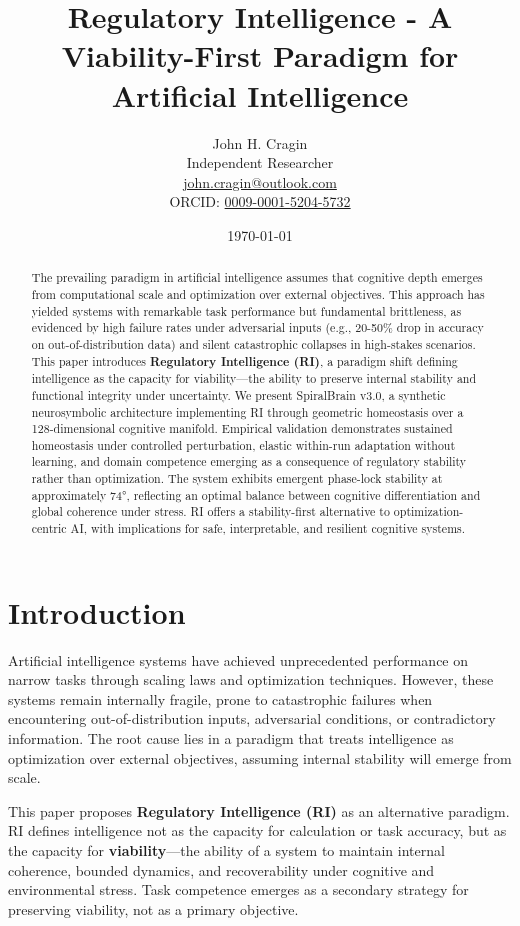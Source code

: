 \documentclass[12pt,a4paper]{report}
\title{Regulatory Intelligence - A Viability-First Paradigm for Artificial Intelligence}
\author{John H. Cragin \\
Independent Researcher \\
\href{mailto:john.cragin@outlook.com}{john.cragin@outlook.com} \\
ORCID: \href{https://orcid.org/0009-0001-5204-5732}{0009-0001-5204-5732}}
\date{\today}
\begin{document}
\maketitle

\begin{abstract}
The prevailing paradigm in artificial intelligence assumes that cognitive depth emerges from computational scale and optimization over external objectives. This approach has yielded systems with remarkable task performance but fundamental brittleness, as evidenced by high failure rates under adversarial inputs (e.g., 20-50\% drop in accuracy on out-of-distribution data) and silent catastrophic collapses in high-stakes scenarios. This paper introduces \textbf{Regulatory Intelligence (RI)}, a paradigm shift defining intelligence as the capacity for viability—the ability to preserve internal stability and functional integrity under uncertainty. We present SpiralBrain v3.0, a synthetic neurosymbolic architecture implementing RI through geometric homeostasis over a 128-dimensional cognitive manifold. Empirical validation demonstrates sustained homeostasis under controlled perturbation, elastic within-run adaptation without learning, and domain competence emerging as a consequence of regulatory stability rather than optimization. The system exhibits emergent phase-lock stability at approximately 74°, reflecting an optimal balance between cognitive differentiation and global coherence under stress. RI offers a stability-first alternative to optimization-centric AI, with implications for safe, interpretable, and resilient cognitive systems.
\end{abstract}

\section{Introduction}

Artificial intelligence systems have achieved unprecedented performance on narrow tasks through scaling laws and optimization techniques. However, these systems remain internally fragile, prone to catastrophic failures when encountering out-of-distribution inputs, adversarial conditions, or contradictory information. The root cause lies in a paradigm that treats intelligence as optimization over external objectives, assuming internal stability will emerge from scale.

This paper proposes \textbf{Regulatory Intelligence (RI)} as an alternative paradigm. RI defines intelligence not as the capacity for calculation or task accuracy, but as the capacity for \textbf{viability}—the ability of a system to maintain internal coherence, bounded dynamics, and recoverability under cognitive and environmental stress. Task competence emerges as a secondary strategy for preserving viability, not as a primary objective.
\end{document}
